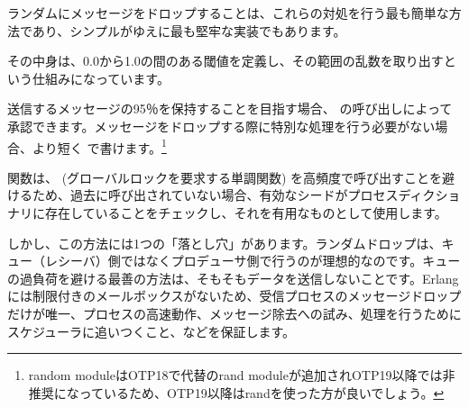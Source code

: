 ランダムにメッセージをドロップすることは、これらの対処を行う最も簡単な方法であり、シンプルがゆえに最も堅牢な実装でもあります。

その中身は、0.0から1.0の間のある閾値を定義し、その範囲の乱数を取り出すという仕組みになっています。


送信するメッセージの95％を保持することを目指す場合、  の呼び出しによって承認できます。メッセージをドロップする際に特別な処理を行う必要がない場合、より短く  で書けます。\footnote{random moduleはOTP18で代替のrand moduleが追加されOTP19以降では非推奨になっているため、OTP19以降はrandを使った方が良いでしょう。}

関数は、 (グローバルロックを要求する単調関数) を高頻度で呼び出すことを避けるため、過去に呼び出されていない場合、有効なシードがプロセスディクショナリに存在していることをチェックし、それを有用なものとして使用します。

しかし、この方法には1つの「落とし穴」があります。ランダムドロップは、キュー（レシーバ）側ではなくプロデューサ側で行うのが理想的なのです。キューの過負荷を避ける最善の方法は、そもそもデータを送信しないことです。Erlangには制限付きのメールボックスがないため、受信プロセスのメッセージドロップだけが唯一、プロセスの高速動作、メッセージ除去への試み、処理を行うためにスケジューラに追いつくこと、などを保証します。


